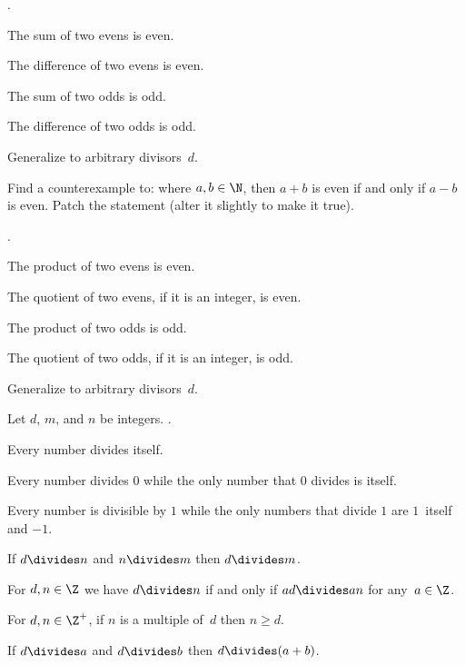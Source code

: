 \documentclass{ibl}
\begin{document}
\begin{ex}\pord.
\begin{exes}
\item The sum of two evens is even.
\item The difference of two evens is even.
\item The sum of two odds is odd.
\item The difference of two odds is odd.
\item Generalize to arbitrary divisors~$d$.
\end{exes}  
\end{ex}

\begin{ex}
Find a counterexample to:
where $a,b\in\N$, then $a+b$ is even if and only if $a-b$ is even.
Patch the statement (alter it slightly to make it true).
\end{ex}

\begin{ex}\pord.
\begin{exes}
\item The product of two evens is even.
\item The quotient of two evens, if it is an integer, is even.
\item The product of two odds is odd.
\item The quotient of two odds, if it is an integer, is odd.
\item Generalize to arbitrary divisors~$d$.
\end{exes}  
\end{ex}

\begin{ex}
Let $d$, $m$, and $n$ be integers.
\pord.
\begin{exes}
\item {} Every number divides itself.
\item Every number divides $0$ while
  the only number that $0$ divides is itself.
\item Every number is divisible by $1$ while
  the only numbers that divide $1$ are $1$~itself and $-1$.
\item {} If $d\divides n$ and $n\divides m$ 
   then $d\divides m$.
\item {} 
  For $d,n\in\Z$ we have $d\divides n$ if and only if 
  $ad\divides an$ for any~$a\in\Z$.
\item {} 
  For $d,n\in\Z^+$, if $n$ is a multiple of~$d$ then $n\geq d$.
\item If $d\divides a$ and $d\divides b$ then $d\divides (a+b)$.  
\end{exes}
\end{ex}
\end{document}
